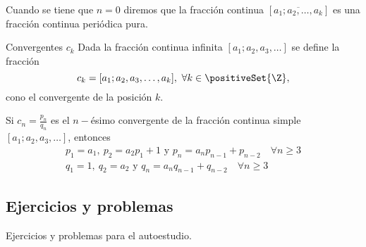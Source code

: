 Cuando se tiene que $n = 0$ diremos que la fracción continua $[\overline{a_1;a_2, \ldots, a_k}]$ es una fracción continua periódica pura.

\begin{definition.box}{Convergentes $c_k$}{}
    Dada la fracción continua infinita $[a_1; a_2, a_3, \ldots]$ se define la fracción
    \[
        c_k = [a_1; a_2, a_3, \ldots, a_k],\ \forall k \in \positiveSet{\Z},
    \]
    cono el convergente de la posición $k$.
\end{definition.box}

\begin{theorem.box}{}{}
    Si $c_n = \frac{p_n}{q_n}$ es el $n-$ésimo convergente de la fracción continua simple $[a_1; a_2, a_3, \ldots]$, entonces
    \begin{align*}
        p_1 = a_1,\ p_2 = a_2 p_1 + 1 \text{ y } p_n = a_n p_{n - 1} + p_{n - 2} \quad \forall n \geq 3\\
        q_1 = 1,\ q_2 = a_2 \text{ y } q_n = a_n q_{n - 1} + q_{n - 2} \quad \forall n \geq 3
    \end{align*}
\end{theorem.box}


\subsection{Ejercicios y problemas}

Ejercicios y problemas para el autoestudio.